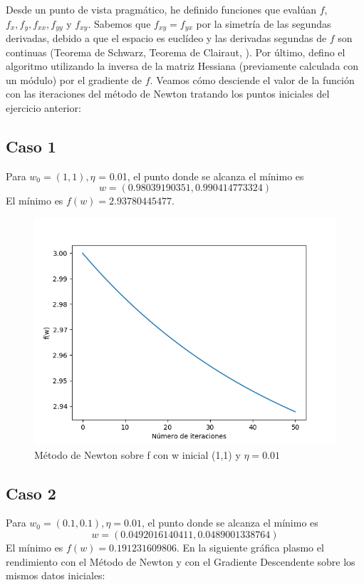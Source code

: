 Desde un punto de vista pragmático, he definido funciones que evalúan $f$, $f_x,f_y, f_{xx},f_{yy}$ y $f_{xy}$. Sabemos que $f_{xy} = f_{yx}$ por la simetría de las segundas derivadas, debido a que el espacio es euclídeo y las derivadas segundas de $f$ son continuas (Teorema de Schwarz, Teorema de Clairaut, \cite{rudin}). Por último, defino el algoritmo utilizando la inversa de la matriz Hessiana (previamente calculada con un módulo) por el gradiente de $f$. Veamos cómo desciende el valor de la función con las iteraciones del método de Newton tratando los puntos iniciales del ejercicio anterior:

\subsection{Caso 1}

Para $w_0=(1,1), \eta$ = 0.01, el punto donde se alcanza el mínimo es $$w=( 0.98039190351 , 0.990414773324 )$$ El mínimo es $f(w) = 2.93780445477$.

\begin{figure}[H] %
	\centering
	\includegraphics[scale=0.6]{bonus1.png}  %
	\caption{Método de Newton sobre f con w inicial (1,1) y $\eta = 0.01$} 
	\label{fig:bon1}
\end{figure}

\subsection{Caso 2}
Para $w_0=(0.1,0.1), \eta = 0.01$, el punto donde se alcanza el mínimo es $$w=(0.0492016140411 , 0.0489001338764)$$ El mínimo es $f(w) =0.191231609806$. En la siguiente gráfica plasmo el rendimiento con el Método de Newton y con el Gradiente Descendente sobre los mismos datos iniciales:

